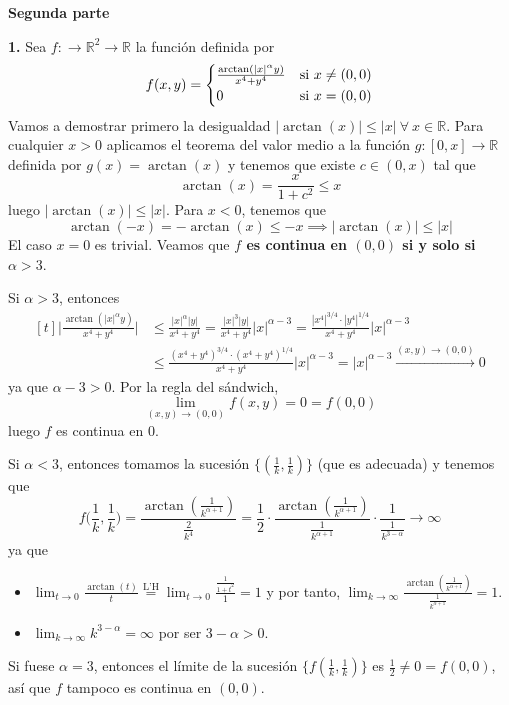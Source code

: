 \documentclass[12pt]{report}
\newcommand{\R}{\mathbb R}
\begin{document}
\begin{center}
    \textbf{Segunda parte}
\end{center}
\textbf{1. } Sea $f \colon \to \R^2 \to \R$ la función definida por
\[f(x,y)=
\begin{cases}
\frac{\arctan(|x|^\alpha y)}{x^4+y^4} & $si$ \ x \neq (0,0) \\
0 & $si$ \ x = (0,0)
\end{cases}
\]
Vamos a demostrar primero la desigualdad $|\arctan(x)| \leq |x| \ \forall \ x \in \R$. Para cualquier $x>0$ aplicamos el teorema del valor medio a la función $g \colon [0,x] \to \R$ definida por $g(x) = \arctan(x)$ y tenemos que existe $c \in (0,x)$ tal que
\[\arctan(x) = \frac{x}{1+c^2} \leq x\]
luego $|\arctan(x)| \leq |x|$. Para $x < 0$, tenemos que
\[\arctan(-x) = -\arctan(x) \leq -x \implies |\arctan(x)| \leq |x|\]
El caso $x = 0$ es trivial. Veamos que \textbf{$f$ es continua en $(0,0)$ si y solo si $\alpha > 3$}.

\vspace{2mm}
Si $\alpha > 3$, entonces
\[
\begin{aligned}[t]
\biggr|\frac{\arctan(|x|^\alpha y)}{x^4 + y^4}\biggl| &\leq \frac{|x|^\alpha |y|}{x^4+y^4} = \frac{|x|^3 |y|}{x^4+y^4}|x|^{\alpha-3} = \frac{{|x^4|}^{3/4} \cdot {|y^4|}^{1/4}}{x^4+y^4}|x|^{\alpha-3}
\\
&\leq \frac{{(x^4+y^4)}^{3/4} \cdot {(x^4+y^4)}^{1/4}}{x^4+y^4}|x|^{\alpha-3} = |x|^{\alpha-3} \xrightarrow{(x,y) \to (0,0)} 0
\end{aligned}
\]
ya que $\alpha-3>0$. Por la regla del sándwich,
\[\lim_{(x,y) \to (0,0)} f(x,y) = 0 = f(0,0)\]
luego $f$ es continua en $0$.

\vspace{2mm}
Si $\alpha < 3$, entonces tomamos la sucesión $\{(\frac{1}{k},\frac{1}{k})\}$ (que es adecuada) y tenemos que
\[f\biggr(\frac{1}{k},\frac{1}{k} \biggl) = \frac{\arctan(\frac{1}{k^{\alpha+1}})}{\frac{2}{k^4}} = \frac{1}{2} \cdot \frac{\arctan(\frac{1}{k^{\alpha+1}})}{\frac{1}{k^{\alpha+1}}} \cdot \frac{1}{\frac{1}{k^{3-\alpha}}} \longrightarrow \infty\]
ya que
\begin{itemize}
    \item $\displaystyle \lim_{t \to 0}\frac{\arctan(t)}{t} \overset{\textrm{L'H}}{=} \lim_{t \to 0}\frac{\frac{1}{1+t^2}}{1} = 1$ y por tanto, $\displaystyle \lim_{k \to \infty}\frac{\arctan(\frac{1}{k^{\alpha+1}})}{\frac{1}{k^{\alpha+1}}} = 1$.
    \item $\displaystyle \lim_{k \to \infty} k^{3-\alpha} = \infty$ por ser $3 - \alpha > 0$.
\end{itemize}
Si fuese $\alpha = 3$, entonces el límite de la sucesión $\{f(\frac{1}{k},\frac{1}{k})\}$ es $\frac{1}{2} \neq 0 = f(0,0)$, así que $f$ tampoco es continua en $(0,0)$.
\end{document}
